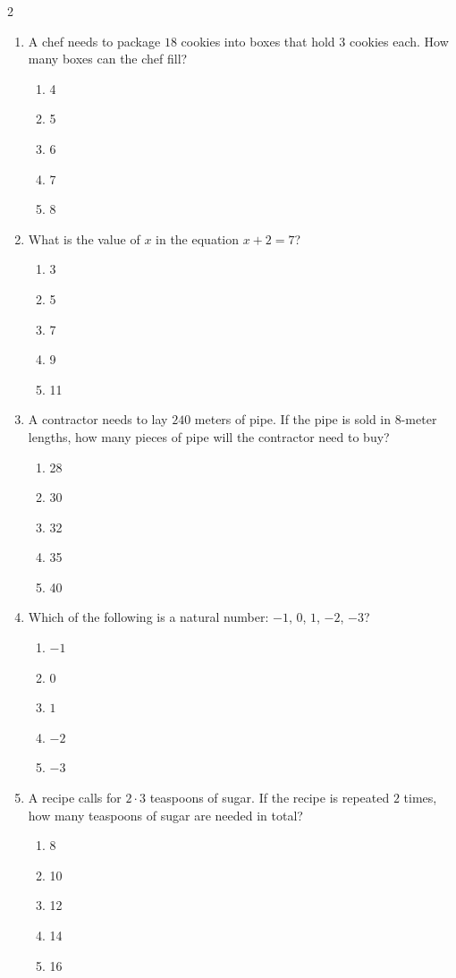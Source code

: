 \documentclass[10pt]{article}
\begin{document}
\begin{multicols}{2}
\begin{enumerate}[label=\textbf{Q\arabic*.}, leftmargin=*, itemsep=6pt, parsep=0pt]
  \item \small A chef needs to package $18$ cookies into boxes that hold $3$ cookies each. How many boxes can the chef fill?
  \begin{enumerate}[label=(\Alph*), leftmargin=0.6cm, nosep, itemsep=2pt]
    \item 4
    \item 5
    \item 6
    \item 7
    \item 8
  \end{enumerate}

  \item \small What is the value of $x$ in the equation $x + 2 = 7$?
  \begin{enumerate}[label=(\Alph*), leftmargin=0.6cm, nosep, itemsep=2pt]
    \item 3
    \item 5
    \item 7
    \item 9
    \item 11
  \end{enumerate}

  \item \small A contractor needs to lay $240$ meters of pipe. If the pipe is sold in $8$-meter lengths, how many pieces of pipe will the contractor need to buy?
  \begin{enumerate}[label=(\Alph*), leftmargin=0.6cm, nosep, itemsep=2pt]
    \item 28
    \item 30
    \item 32
    \item 35
    \item 40
  \end{enumerate}

  \item \small Which of the following is a natural number: $-1$, $0$, $1$, $-2$, $-3$?
  \begin{enumerate}[label=(\Alph*), leftmargin=0.6cm, nosep, itemsep=2pt]
    \item $-1$
    \item $0$
    \item $1$
    \item $-2$
    \item $-3$
  \end{enumerate}

  \item \small A recipe calls for $2 \cdot 3$ teaspoons of sugar. If the recipe is repeated $2$ times, how many teaspoons of sugar are needed in total?
  \begin{enumerate}[label=(\Alph*), leftmargin=0.6cm, nosep, itemsep=2pt]
    \item 8
    \item 10
    \item 12
    \item 14
    \item 16
  \end{enumerate}


\end{enumerate}
\end{multicols}
\end{document}
